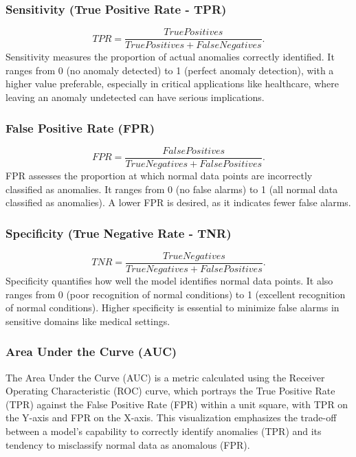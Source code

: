 \subsubsection{Sensitivity (True Positive Rate - TPR)}
\[ TPR=\frac{TruePositives}{TruePositives+FalseNegatives}. \]
Sensitivity measures the proportion of actual anomalies correctly identified. It ranges from 0 (no anomaly detected) to 1 (perfect anomaly detection), with a higher value preferable, especially in critical applications like healthcare, where leaving an anomaly undetected can have serious implications.

\subsubsection{False Positive Rate (FPR)}
\[ FPR=\frac{FalsePositives}{TrueNegatives+FalsePositives}. \]
FPR assesses the proportion at which normal data points are incorrectly classified as anomalies. It ranges from 0 (no false alarms) to 1 (all normal data classified as anomalies). A lower FPR is desired, as it indicates fewer false alarms.

\subsubsection{Specificity (True Negative Rate - TNR)}
\[ TNR=\frac{TrueNegatives}{TrueNegatives+FalsePositives} .\]
Specificity quantifies how well the model identifies normal data points. It also ranges from 0 (poor recognition of normal conditions) to 1 (excellent recognition of normal conditions). Higher specificity is essential to minimize false alarms in sensitive domains like medical settings.

\subsubsection{Area Under the Curve (AUC)}
The Area Under the Curve (AUC) is a metric calculated using the Receiver Operating Characteristic (ROC) curve, which portrays the True Positive Rate (TPR) against the False Positive Rate (FPR) within a unit square, with TPR on the Y-axis and FPR on the X-axis. This visualization emphasizes the trade-off between a model's capability to correctly identify anomalies (TPR) and its tendency to misclassify normal data as anomalous (FPR).\\

